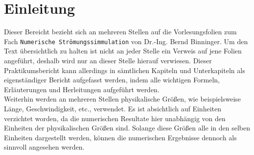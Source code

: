 \chapter{Einleitung}
Dieser Bereicht bezieht sich an mehreren Stellen auf die Vorlesungsfolien zum Fach \texttt{Numerische Str\"omungssimmulation} von Dr.-Ing. Bernd Binninger. Um den Text \"ubersichtlich zu halten ist nicht an jeder Stelle ein Verweis auf jene Folien angef\"uhrt, deshalb wird nur an dieser Stelle hierauf verwiesen. Dieser Praktikumsbericht kann allerdings in s\"amtlichen Kapiteln und Unterkapiteln als eigenst\"andiger Bericht aufgefasst werden, indem alle wichtigen Formeln, Erl\"auterungen und Herleitungen aufgef\"uhrt werden. \\[0.5cm]
Weiterhin werden an mehreren Stellen physikalische Gr\"o\ss{}en, wie beispielsweise L\"ange, Geschwindigkeit, etc., verwendet. Es ist absichtlich auf Einheiten verzichtet worden, da die numerischen Resultate hier unabh\"angig von den Einheiten der physikalischen Gr\"o\ss{}en sind. Solange diese Gr\"o\ss{}en alle in den selben Einheiten dargestellt werden, k\"onnen die numerischen Ergebnisse dennoch als sinnvoll angesehen werden.